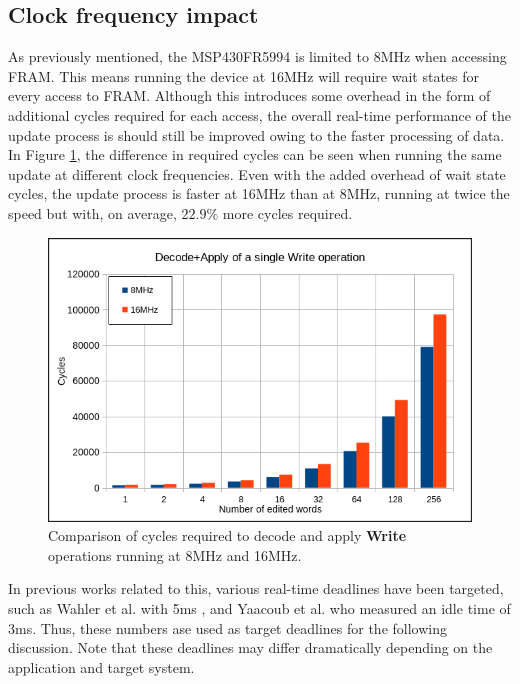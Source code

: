 \subsection{Clock frequency impact}
As previously mentioned, the MSP430FR5994 is limited to 8MHz when accessing FRAM. This means running the device at 16MHz will require wait states for every access to FRAM. Although this introduces some overhead in the form of additional cycles required for each access, the overall real-time performance of the update process is should still be improved owing to the faster processing of data.  
In Figure \ref{fig:w8vs16}, the difference in required cycles can be seen when running the same update at different clock frequencies. Even with the added overhead of wait state cycles, the update process is faster at 16MHz than at 8MHz, running at twice the speed but with, on average, $22.9\%$ more cycles required. 
\begin{figure}[!ht]
    \begin{shaded}
        \centering
        \includegraphics[width=\figurewidth]{img/W8vs16.png}
        \caption{Comparison of cycles required to decode and apply \textbf{Write} operations running at 8MHz and 16MHz.}
        \label{fig:w8vs16}
    \end{shaded}
\end{figure}

In previous works related to this, various real-time deadlines have been targeted, such as Wahler et al. with 5ms \cite{dynUpdateFramework}, and Yaacoub et al. who measured an idle time of 3ms. Thus, these numbers ase used as target deadlines for the following discussion. Note that these deadlines may differ dramatically depending on the application and target system. 

